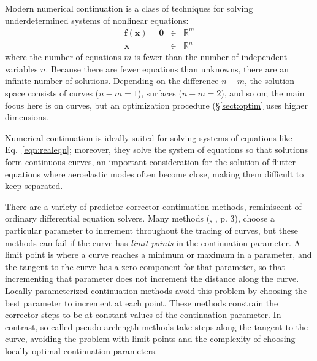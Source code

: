 \documentclass[11pt,openany,twoside]{book}
\numberwithin{equation}{section}		%
\newcommand{\Newterm}[1]{{\em #1}}
\newcommand{\Vector}[1]{\boldsymbol{#1}}
\newcommand{\Sectref}[1]{\S\ref{#1}}
\newcommand{\Eqn}[1]{Eq.\ \ref{#1}}  %
\begin{document}
Modern numerical continuation is a class of techniques for solving
underdetermined systems of nonlinear equations:
\begin{eqnarray}\label{eqn:fx}
\Vector{f}(\Vector{x}) = \Vector{0} & \in & \mathbb{R}^{m} \nonumber \\
\Vector{x} & \in & \mathbb{R}^{n}
\end{eqnarray}
where the number of equations $m$
is fewer than the number of independent variables $n$.
Because there are fewer equations than unknowns, there are an infinite
number of solutions.
Depending on the difference $n-m$, the solution space consists of
curves ($n-m = 1$), surfaces ($n-m = 2$), and so on; the main focus here
is on curves, but an optimization procedure (\Sectref{sect:optim}
uses higher dimensions.
\par
Numerical continuation is ideally suited for solving systems of equations
like \Eqn{eqn:realeqn}; moreover, they solve the system of equations
so that solutions form continuous curves,
an important consideration for the solution of flutter equations
where aeroelastic modes often become close, making them difficult to
keep separated.
\par
There are a variety of predictor-corrector continuation methods, 
reminiscent of ordinary differential equation solvers.
Many methods
(\cite{cardani1978continuation}, \cite{yu2020nonlinear},
\cite{allgower1990numerical} p. 3),
choose a particular parameter to increment throughout the tracing of curves,
but these methods can fail if the curve has \Newterm{limit points} in
the continuation parameter.
A limit point is where a curve reaches a minimum or maximum in a parameter,
and the tangent to the curve has a zero component for that parameter,
so that incrementing that parameter does not increment the distance along the
curve.
Locally parameterized continuation methods \cite{rheinboldt1983locally}
avoid this problem
by choosing the best parameter to increment at each point.
These methods constrain the corrector steps to be at constant values of the
continuation parameter.
In contrast, so-called pseudo-arclength methods take steps along the tangent
to the curve, avoiding the problem with limit points and the complexity of
choosing locally optimal continuation parameters.
\end{document}
